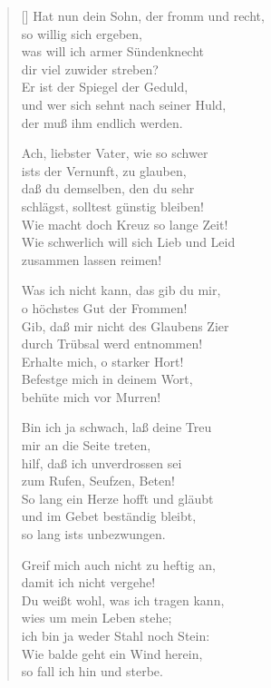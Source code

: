 \begin{multicols}{2}
\begin{verse}[\versewidth]
 Hat nun dein Sohn, der fromm und recht,\\
so willig sich ergeben,\\
was will ich armer Sündenknecht\\
dir viel zuwider streben?\\
Er ist der Spiegel der Geduld,\\
und wer sich sehnt nach seiner Huld,\\
der muß ihm endlich werden.

 Ach, liebster Vater, wie so schwer\\
ists der Vernunft, zu glauben,\\
daß du demselben, den du sehr\\
schlägst, solltest günstig bleiben!\\
Wie macht doch Kreuz so lange Zeit!\\
Wie schwerlich will sich Lieb und Leid\\
zusammen lassen reimen!

 Was ich nicht kann, das gib du mir,\\
o höchstes Gut der Frommen!\\
Gib, daß mir nicht des Glaubens Zier\\
durch Trübsal werd entnommen!\\
Erhalte mich, o starker Hort!\\
Befestge mich in deinem Wort,\\
behüte mich vor Murren!

 Bin ich ja schwach, laß deine Treu\\
mir an die Seite treten,\\
hilf, daß ich unverdrossen sei\\
zum Rufen, Seufzen, Beten!\\
So lang ein Herze hofft und gläubt\\
und im Gebet beständig bleibt,\\
so lang ists unbezwungen.

 Greif mich auch nicht zu heftig an,\\
damit ich nicht vergehe!\\
Du weißt wohl, was ich tragen kann,\\
wies um mein Leben stehe;\\
ich bin ja weder Stahl noch Stein:\\
Wie balde geht ein Wind herein,\\
so fall ich hin und sterbe.


\end{verse}
\end{multicols}
